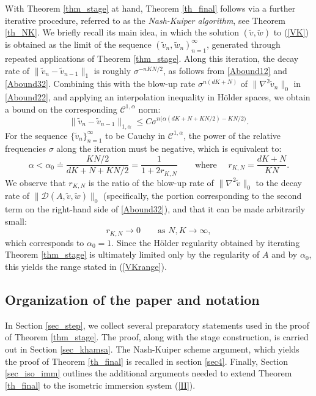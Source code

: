 \documentclass[reqno,twoside,11pt]{amsart}
\numberwithin{equation}{section}
\theoremstyle{plain}
\theoremstyle{definition}
\begin{document}
\noindent With Theorem \ref{thm_stage} at hand, Theorem \ref{th_final}
follows via a further iterative procedure, referred to as the {\em
  Nash-Kuiper algorithm}, see Theorem \ref{th_NK}. We briefly recall
its main idea, in which the solution $(\tilde v, \tilde w)$ to
(\ref{VK}) is obtained as the limit of the sequence ${(\tilde v_n,
  \tilde w_n)}_{n=1}^\infty$, generated through repeated applications
of Theorem \ref{thm_stage}. 
Along this iteration, the decay rate of $\|\tilde v_n - \tilde
v_{n-1}\|_1$ is roughly $\sigma^{-nKN/2}$, as follows from
\ref{Abound12} and \ref{Abound32}. Combining this with the blow-up
rate $\sigma^{n(dK+N)}$ of $\|\nabla^2 \tilde v_n\|_0$ in
\ref{Abound22}, and applying an interpolation inequality in H\"older
spaces, we obtain a bound on the corresponding ${\mathcal C}^{1,\alpha}$ norm: 
\begin{equation*}
\|\tilde v_n-\tilde v_{n-1}\|_{1,\alpha}\leq C\sigma^{n\big(\alpha(dK+N+KN/2)-KN/2\big)}.
\end{equation*}
For the sequence $\{\tilde v_n\}_{n=1}^\infty$ to be Cauchy in
${\mathcal C}^{1,\alpha}$, the power of the relative frequencies
$\sigma$ along the iteration must be negative, which is equivalent to:
\begin{equation*}
\alpha< \alpha_0\doteq \frac{KN/2}{dK+N+KN/2} = \frac{1}{1+2r_{K,N}} 
\qquad\mbox{where }\quad r_{K,N} = \frac{dK+N}{KN}. 
\end{equation*}
We observe that $r_{K,N}$ is the ratio of the blow-up rate of
$\|\nabla^2 \tilde v\|_0$ to the decay rate of $\|\mathcal{D}(A, \tilde
v, \tilde w)\|_0$ (specifically, the portion corresponding to the
second term on the right-hand side of \ref{Abound32}), and that it can be made arbitrarily small:
\begin{equation*}
r_{K,N} \to 0 \qquad \mbox{as } N, K\to\infty,
\end{equation*}
which corresponds to $\alpha_0 = 1$. Since the H\"older regularity
obtained by iterating Theorem \ref{thm_stage} is ultimately limited
only by the regularity of $A$ and by $\alpha_0$, this yields the range
stated in (\ref{VKrange}). 
\smallskip

\subsection{Organization of the paper and notation} 
In Section \ref{sec_step}, we collect several preparatory statements used in
the proof of Theorem \ref{thm_stage}. The proof, along with the stage
construction, is carried out in Section \ref{sec_khamsa}. The Nash-Kuiper
scheme argument, which yields the proof of Theorem \ref{th_final} is recalled in
section \ref{sec4}. Finally, Section \ref{sec_iso_imm} outlines
the additional arguments needed to extend Theorem \ref{th_final} to
the isometric immersion system (\ref{II}). 
\end{document}
